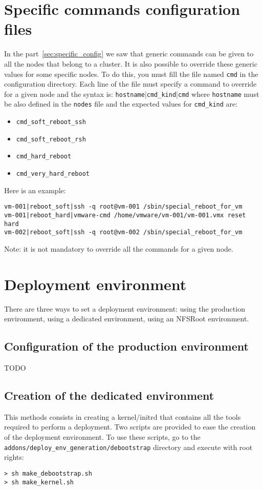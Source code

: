 \documentclass[a4wide,10pt,oneside]{book}
\begin{document}
\section{Specific commands configuration files}
In the part~\ref{sec:specific_config} we saw that generic commands can be given to all the nodes that belong to a cluster. It is also possible to override these generic values for some specific nodes. To do this, you must fill the file named \texttt{cmd} in the configuration directory. Each line of the file must specify a command to override for a given node and the syntax is: \texttt{hostname}|\texttt{cmd\_kind}|\texttt{cmd} where \texttt{hostname} must be also defined in the \texttt{nodes} file and the expected values for \texttt{cmd\_kind} are:
\begin{itemize}
\item \texttt{cmd\_soft\_reboot\_ssh}
\item \texttt{cmd\_soft\_reboot\_rsh}
\item \texttt{cmd\_hard\_reboot}
\item \texttt{cmd\_very\_hard\_reboot}
\end{itemize}

Here is an example:
\begin{small}
\begin{verbatim}
vm-001|reboot_soft|ssh -q root@vm-001 /sbin/special_reboot_for_vm
vm-001|reboot_hard|vmware-cmd /home/vmware/vm-001/vm-001.vmx reset hard
vm-002|reboot_soft|ssh -q root@vm-002 /sbin/special_reboot_for_vm
\end{verbatim}
\end{small}
Note: it is not mandatory to override all the commands for a given node.


\section{Deployment environment}
There are three ways to set a deployment environment: using the production environment, using a dedicated environment, using an NFSRoot environment.

\subsection{Configuration of the production environment}
TODO
\subsection{Creation of the dedicated environment}
This methods consists in creating a kernel/initrd that contains all the tools required to perform a deployment. Two scripts are provided to ease the creation of the deployment environment. To use these scripts, go to the \texttt{addons/deploy\_env\_generation/debootstrap} directory and execute with root rights:
\begin{small}
\begin{verbatim}
> sh make_debootstrap.sh
> sh make_kernel.sh
\end{verbatim}
\end{small}
\end{document}
